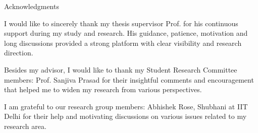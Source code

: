 \begin{center}
\LARGE{Acknowledgments} 
\end{center}

\vspace{0.5in}

\setlength{\parindent}{1.0em}

I would like to sincerely thank my thesis supervisor Prof. \Guide{}
for his continuous support during my study and research.
His guidance, patience, motivation and long discussions provided a
strong platform with clear visibility and research direction.

Besides my advisor, I would like to thank my
Student Research Committee members: Prof. Sanjiva Prasad
for their insightful comments and encouragement that helped me to widen my research from various perspectives.

I am grateful to our research group members: Abhishek Rose, Shubhani at IIT Delhi for
their help and motivating discussions on various issues related to my research area.

\vspace{0.8in}


{\bfseries \Auth}



